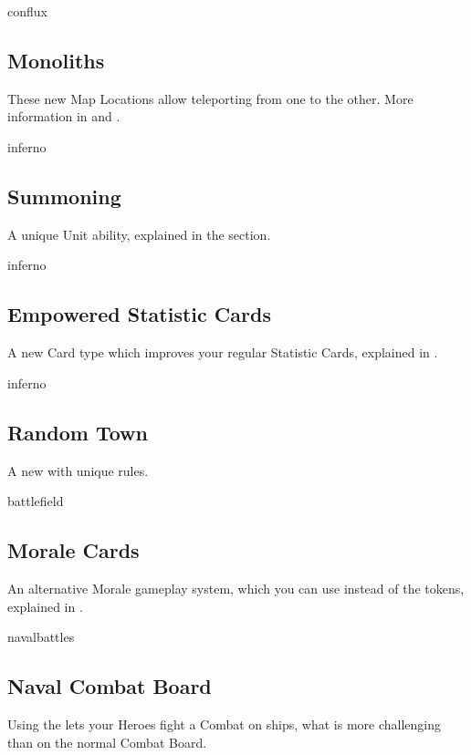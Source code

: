 \begin{multicols*}{2}
\vspace*{1em}
\begin{expansion}{conflux}
   \subsection*{Monoliths}
   These new Map Locations allow teleporting from one to the other.
   More information in  and .
\end{expansion}

\vspace*{1em}
\begin{expansion}{inferno}
    \subsection*{Summoning}
    A unique Unit ability, explained in the  section.
\end{expansion}

\vspace*{1em}
\begin{expansion}{inferno}
    \subsection*{Empowered Statistic Cards}
    A new Card type which improves your regular Statistic Cards, explained in .
\end{expansion}

\vspace*{1em}
\begin{expansion}{inferno}
    \subsection*{Random Town}
    A new  with unique rules.
\end{expansion}

\vspace*{1em}
\begin{expansion}{battlefield}
    \subsection*{Morale Cards}
    An alternative Morale gameplay system, which you can use instead of the tokens, explained in .
\end{expansion}

\vspace*{1em}
\begin{expansion}{navalbattles}
    \subsection*{Naval Combat Board}
    Using the  lets your Heroes fight a Combat on ships, what is more challenging than on the normal Combat Board.
\end{expansion}
\end{multicols*}

